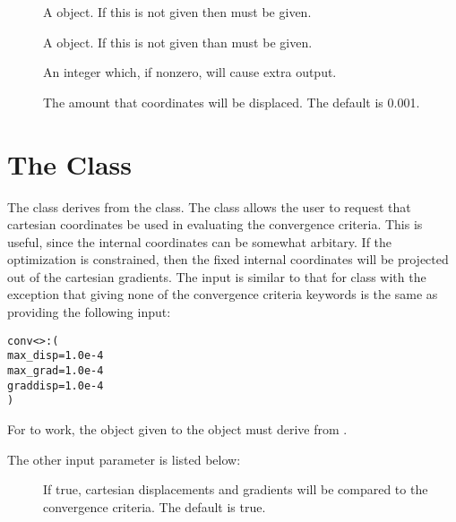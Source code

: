 \begin{description}
  \item[] A  object.  If this is not
    given then  must be given.

  \item[] A  object.  If this is not
    given than  must be given.

  \item[] An integer which, if nonzero, will cause extra
    output.

  \item[] The amount that coordinates will be
    displaced.  The default is 0.001.

\end{description}


\section{The  Class}\label{MolEnergyConvergence}

The  class derives from the
 class.  The  class
allows the user to request that cartesian coordinates be used in evaluating
the convergence criteria.  This is useful, since the internal coordinates
can be somewhat arbitary.  If the optimization is constrained, then the
fixed internal coordinates will be projected out of the cartesian
gradients.  The input is similar to that for  class
with the exception that giving none of the convergence criteria keywords is
the same as providing the following input:
\begin{alltt}
  conv<>: (
    max_disp = 1.0e-4
    max_grad = 1.0e-4
    graddisp = 1.0e-4
  )
\end{alltt}

For  to work, the  object
given to the  object must derive from
.

The other input parameter is listed below:
\begin{description}
  \item[] If true, cartesian displacements and gradients
    will be compared to the convergence criteria.  The default is true.

\end{description}
